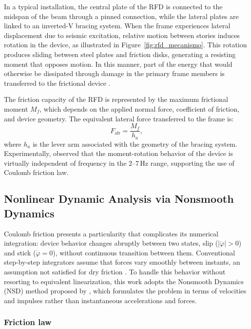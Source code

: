 \documentclass[preprint,12pt,authoryear]{elsarticle}
\newcommand{\Mf}{M_{\!f}}
\newcommand{\ha}{h_a}
\begin{document}
In a typical installation, the central plate of the RFD is connected to the midspan of the beam
through a pinned connection, while the lateral plates are linked to an inverted-V bracing system.
When the frame experiences lateral displacement due to seismic excitation, relative motion between
stories induces rotation in the device, as illustrated in Figure~\ref{fig:rfd_mecanismo}. This rotation
produces sliding between steel plates and friction disks, generating a resisting moment that opposes
motion. In this manner, part of the energy that would otherwise be dissipated through damage in the
primary frame members is transferred to the frictional device \citep{kim_use_2011}.

The friction capacity of the RFD is represented by the maximum frictional moment $\Mf$, which depends
on the applied normal force, coefficient of friction, and device geometry. The equivalent lateral
force transferred to the frame is:
\begin{equation}
    F_{\mathrm{afr}} = \frac{\Mf}{\ha},
    \label{eq:Fafr}
\end{equation}
where $\ha$ is the lever arm associated with the geometry of the bracing system. Experimentally,
\citet{Mualla2002} observed that the moment-rotation behavior of the device is virtually independent
of frequency in the 2--7\,Hz range, supporting the use of Coulomb friction law.

\subsection{Nonlinear Dynamic Analysis via Nonsmooth Dynamics}
\label{sec:theory:dns}

Coulomb friction presents a particularity that complicates its numerical integration: device behavior
changes abruptly between two states, slip ($|\dot{\varphi}|>0$) and stick ($\dot{\varphi}=0$), without
continuous transition between them. Conventional step-by-step integrators assume that forces vary
smoothly between instants, an assumption not satisfied for dry friction \citep{chopra_dynamics_2015}.
To handle this behavior without resorting to equivalent linearization, this work adopts the Nonsmooth
Dynamics (NSD) method proposed by \citet{Namorado2024}, which formulates the problem in terms of
velocities and impulses rather than instantaneous accelerations and forces.

\subsubsection*{Friction law}
\end{document}
